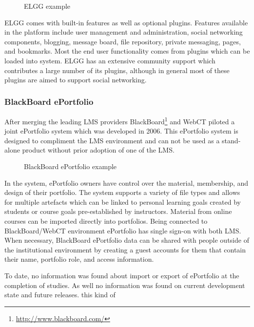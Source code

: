 \begin{figure}[htb]
\centering
\setlength\fboxsep{0pt}
\setlength\fboxrule{0.5pt}
\caption{ELGG example}
\label{fig:elgg}
\end{figure}

ELGG comes with built-in features as well as optional plugins. Features
available in the platform include user management and administration, social
networking components, blogging, message board, file repository, private
messaging, pages, and bookmarks. Most the end user functionality comes from
plugins which can be loaded into system. ELGG has an extensive community support
which contributes a large number of its plugins, although in general most of
these plugins are aimed to support social networking.

\subsubsection{BlackBoard ePortfolio}
After merging the leading LMS providers
BlackBoard\footnote{\url{http://www.blackboard.com/}} and WebCT piloted a joint
ePortfolio system which was developed in 2006. This ePortfolio system is
designed to compliment the LMS environment and can not be used as a stand-alone
product without prior adoption of one of the LMS.

\begin{figure}[htb]
\centering 
\setlength\fboxsep{0pt}
\setlength\fboxrule{0.5pt}
\fbox{\texttt{[image: CH4-F6-BB]}}
\caption[BlackBoard ePortfolio example]{BlackBoard ePortfolio example}
\label{fig:bbep}
\end{figure}

In the system, ePortfolio owners have control over the material, membership, and
design of their portfolio. The system supports a variety of file types and
allows for multiple artefacts which can be linked to personal learning goals
created by students or course goals pre-established by instructors. Material
from online courses can be imported directly into portfolios. Being connected to
BlackBoard/WebCT environment ePortfolio has single sign-on with both LMS. When
necessary, BlackBoard ePortfolio data can be shared with people outside of the
institutional environment by creating a guest accounts for them that contain
their name, portfolio role, and access information.

To date, no information was found about import or export of ePortfolio at the
completion of studies. As well no information was found on current development
state and future releases.
this kind of
